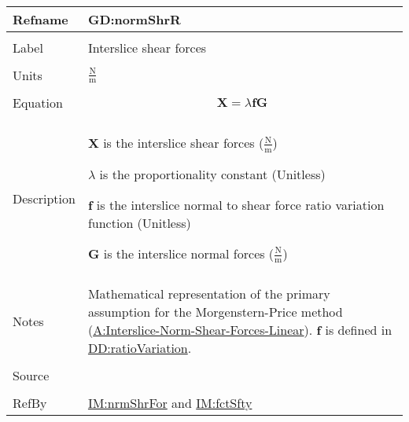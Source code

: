 \documentclass[12pt]{article}
\begin{document}
\vspace{\baselineskip}
\noindent
\begin{minipage}{\textwidth}
\begin{tabular}{>{\raggedright}p{}>{\raggedright\arraybackslash}p{}}
\toprule \textbf{Refname} & \textbf{GD:normShrR}
\label{GD:normShrR}
\\ \midrule \\
Label & Interslice shear forces
        
\\ \midrule \\
Units & $\frac{\text{N}}{\text{m}}$
        
\\ \midrule \\
Equation & \begin{displaymath}
           \symbf{X}=λ \symbf{f} \symbf{G}
           \end{displaymath}
\\ \midrule \\
Description & \begin{symbDescription}
              \item{$\symbf{X}$ is the interslice shear forces ($\frac{\text{N}}{\text{m}}$)}
              \item{$λ$ is the proportionality constant (Unitless)}
              \item{$\symbf{f}$ is the interslice normal to shear force ratio variation function (Unitless)}
              \item{$\symbf{G}$ is the interslice normal forces ($\frac{\text{N}}{\text{m}}$)}
              \end{symbDescription}
\\ \midrule \\
Notes & Mathematical representation of the primary assumption for the Morgenstern-Price method (\hyperref[assumpINSFL]{A:Interslice-Norm-Shear-Forces-Linear}). $\symbf{f}$ is defined in \hyperref[DD:ratioVariation]{DD:ratioVariation}.
        
\\ \midrule \\
Source & \cite{chen2005}
         
\\ \midrule \\
RefBy & \hyperref[IM:nrmShrFor]{IM:nrmShrFor} and \hyperref[IM:fctSfty]{IM:fctSfty}
        
\\ \bottomrule
\end{tabular}
\end{minipage}
\end{document}
